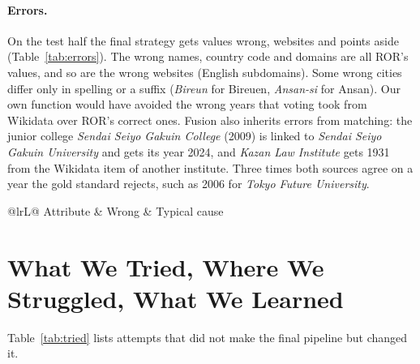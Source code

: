\documentclass[runningheads,a4paper]{llncs}
\begin{document}
\paragraph{Errors.} On the test half the final strategy gets \fusWrong{} values wrong, websites and points
aside (Table~\ref{tab:errors}). The wrong names, country code and domains are all ROR's values, and so are
the \fusWrongWebsite{} wrong websites (English subdomains). Some wrong cities differ only in spelling or a suffix
(\emph{Bireun} for Bireuen, \emph{Ansan-si} for Ansan). Our own function would have avoided the wrong
years that voting took from Wikidata over ROR's correct ones. Fusion also inherits errors from matching:
the junior college \emph{Sendai Seiyo Gakuin College} (2009) is linked to \emph{Sendai Seiyo Gakuin
University} and gets its year 2024, and \emph{Kazan Law Institute} gets 1931 from the Wikidata item of
another institute. Three times both sources agree on a year the gold standard rejects, such as 2006 for
\emph{Tokyo Future University}.

\begin{table}[H]
\caption{Wrong values of the final strategy on the test half and their typical cause}\label{tab:errors}
\scriptsize
\setlength{\tabcolsep}{4pt}
\begin{tabularx}{\textwidth}{@{}lrL@{}}
\toprule
Attribute & Wrong & Typical cause\\
\midrule
{}
\bottomrule
\end{tabularx}
\end{table}

\section{What We Tried, Where We Struggled, What We Learned}\label{sec:lessons}

Table~\ref{tab:tried} lists attempts that did not make the final pipeline but changed it.
\end{document}
